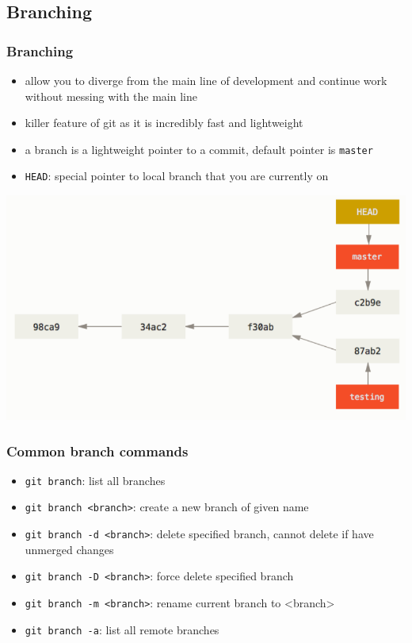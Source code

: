\documentclass[12pt]{beamer}
\begin{document}
\subsection{Branching}
\begin{frame}
\frametitle{Branching}
\begin{itemize}
	\item allow you to diverge from the main line of development and continue work without messing with the main line	
	\item killer feature of git as it is incredibly fast and lightweight
	\item a branch is a lightweight pointer to a commit, default pointer is \texttt{master}
	\item \texttt{HEAD}: special pointer to local branch that you are currently on
\end{itemize}
\begin{center}
	\includegraphics[width=0.6\linewidth]{branching}
\end{center}
\end{frame}

\begin{frame}
\frametitle{Common branch commands}
\begin{itemize}
	\item \texttt{git branch}: list all branches
	\item \texttt{git branch <branch>}: create a new branch of given name
	\item \texttt{git branch -d <branch>}: delete specified branch, cannot delete if have unmerged changes
	\item \texttt{git branch -D <branch>}: force delete specified branch
	\item \texttt{git branch -m <branch>}: rename current branch to <branch>
	\item \texttt{git branch -a}: list all remote branches
\end{itemize}
\end{frame}
\end{document}
